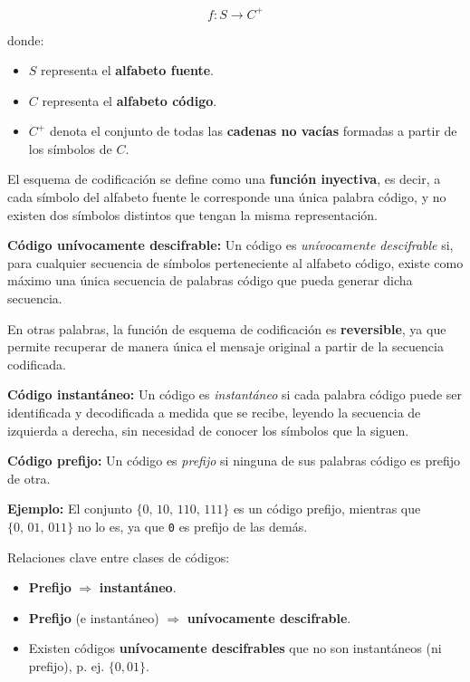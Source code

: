 \documentclass[11pt,a4paper]{article}
\begin{document}
\[
f: S \rightarrow C^{+}
\]

donde:
\begin{itemize}
    \item $S$ representa el \textbf{alfabeto fuente}.
    \item $C$ representa el \textbf{alfabeto código}.
    \item $C^{+}$ denota el conjunto de todas las \textbf{cadenas no vacías} formadas a partir de los símbolos de $C$.
\end{itemize}

El esquema de codificación se define como una \textbf{función inyectiva}, es decir, a cada símbolo del alfabeto fuente le corresponde una única palabra código, y no existen dos símbolos distintos que tengan la misma representación.

\textbf{Código unívocamente descifrable:}
Un código es \emph{unívocamente descifrable} si, para cualquier secuencia de símbolos perteneciente al alfabeto código,
existe como máximo una única secuencia de palabras código que pueda generar dicha secuencia.

En otras palabras, la función de esquema de codificación es \textbf{reversible},
ya que permite recuperar de manera única el mensaje original a partir de la secuencia codificada.

\textbf{Código instantáneo:}
Un código es \emph{instantáneo} si cada palabra código puede ser identificada y decodificada a medida que se recibe,
leyendo la secuencia de izquierda a derecha, sin necesidad de conocer los símbolos que la siguen.

\textbf{Código prefijo:}
Un código es \emph{prefijo} si ninguna de sus palabras código es prefijo de otra.

\medskip

\textbf{Ejemplo:}
El conjunto $\{0,\, 10,\, 110,\, 111\}$ es un código prefijo,
mientras que $\{0,\, 01,\, 011\}$ no lo es, ya que \texttt{0} es prefijo de las demás.

\begin{NotaBox}
Relaciones clave entre clases de códigos:
\begin{itemize}
	\item \textbf{Prefijo} $\Rightarrow$ \textbf{instantáneo}.
	\item \textbf{Prefijo} (e instantáneo) $\Rightarrow$ \textbf{unívocamente descifrable}.
	\item Existen códigos \textbf{unívocamente descifrables} que no son instantáneos (ni prefijo), p. ej. $\{0,01\}$.
\end{itemize}
\end{NotaBox}
\end{document}
